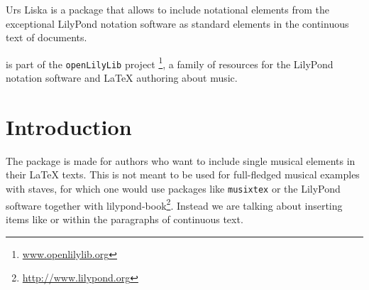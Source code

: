 \documentclass{OLLbook}
\begin{document}
\newcommand{\glyphlist}[3]{%
	\begin{figure}[htbp]
		\centering
		\texttt{[image: glyphlist/resources/\#3]}
		\caption{#1}
		\label{fig:#2}
	\end{figure}
}


\author{Urs Liska}

\maketitle

\pagebreak

\tableofcontents
\vfill

\pagebreak

\begin{authorAbstract}{Urs Liska}
\lilyglyphs is a package that allows to include notational elements from the exceptional LilyPond notation software as standard elements in the continuous text of  documents.

\lilyglyphs is part of the \texttt{openLilyLib} project%
\footnote{\url{www.openlilylib.org}}, 
a family of resources for the LilyPond notation software and \LaTeX{} authoring about music.
\end{authorAbstract}

\vfill


\chapter{Introduction}
\label{chap:introduction}
The package \lilyglyphs is made for authors who want to include single musical elements in their \LaTeX{} texts. 
This is not meant to be used for full-fledged musical examples with staves, for which one would use packages like \texttt{musixtex} or the LilyPond software together with lilypond-book\footnote{\url{http://www.lilypond.org}}. 
Instead we are talking about inserting items like \quaver or \lilyRFZ within the paragraphs of continuous text.
\end{document}
